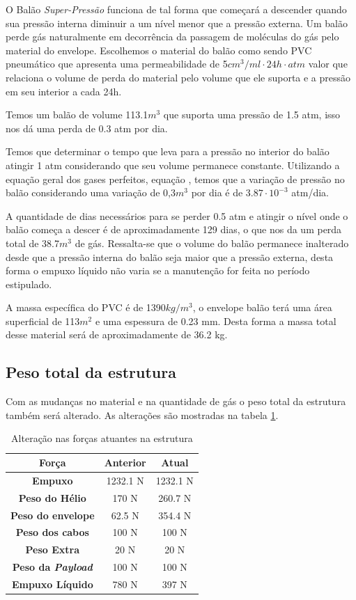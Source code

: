 O Balão \textit{Super-Pressão} funciona de tal forma que começará a descender quando sua pressão interna diminuir a um nível menor que a pressão externa. Um balão perde gás naturalmente em decorrência da passagem de moléculas do gás pelo material do envelope. Escolhemos o material do balão como sendo PVC pneumático que apresenta uma permeabilidade de  5$cm^3/ml\cdot24h\cdot atm$   valor que relaciona o volume de  perda do material pelo volume que ele suporta e a pressão em seu interior a cada 24h.

Temos um balão de volume 113.1$m^3$ que suporta uma pressão de 1.5 atm, isso nos dá uma perda de 0.3 atm por dia.

Temos que determinar o tempo que leva para a pressão no interior do balão atingir 1 atm considerando que seu volume permanece constante. Utilizando a equação geral dos gases perfeitos, equação \label{gasideal}, temos que a variação de pressão no balão considerando uma variação de 0,3$m^3$ por dia é de $3.87\cdot10^{-3}$ atm/dia.

A quantidade de dias necessários para se perder 0.5 atm e atingir o nível onde o balão começa a descer é de aproximadamente 129 dias, o que nos da um perda total de 38.7$m^3$ de gás. Ressalta-se que o volume do balão permanece inalterado desde que a pressão interna do balão seja maior que a pressão externa, desta forma o empuxo líquido não varia se a manutenção for feita no período estipulado.

A massa específica do PVC é de 1390$kg/m^3$, o envelope balão terá uma área superficial de 113$m^2$ e uma espessura de 0.23 mm. Desta forma a massa total desse material será de aproximadamente de 36.2 kg.


\subsection{Peso total da estrutura}
Com as mudanças no material e na quantidade de gás o peso total da estrutura também será alterado. As alterações são mostradas na tabela \ref{tab:forcanova}.

\begin{table}[htp]
	\centering
	\caption{Alteração nas forças atuantes na estrutura}
	\begin{tabular}{ | c || c | c |}
		\hline
		\textbf{Força} &\textbf{Anterior} &\textbf{Atual} \\ \hline
		\textbf{Empuxo} & 1232.1 N & 1232.1 N \\ \hline
		\textbf{Peso do Hélio}  & 170 N& 260.7 N \\\hline
		\textbf{Peso do envelope} & 62.5 N&  354.4 N\\ \hline
		\textbf{Peso dos cabos} & 100 N &  100 N \\\hline
		\textbf{Peso Extra} & 20 N &  20 N \\\hline
		\textbf{Peso da \textit{Payload}} & 100 N &  100 N \\\hline
		\textbf{Empuxo Líquido} & 780 N &  397 N \\
		 \hline
	\end{tabular}
	\label{tab:forcanova}
\end{table}

